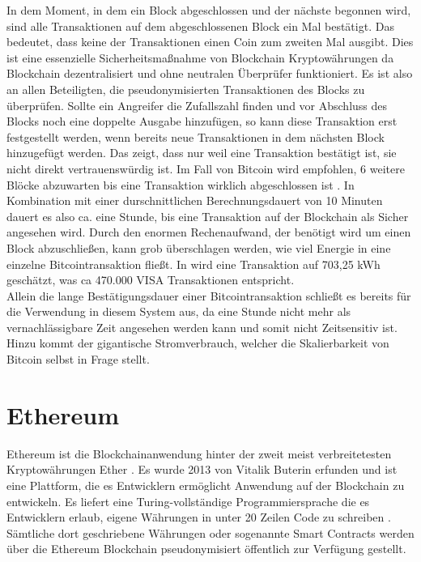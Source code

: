 \documentclass[
	fontsize=12pt,
	headings=small,
	parskip=half,           %
	bibliography=totoc,
	numbers=noenddot,       %
	open=any,               %
]{scrreprt}
\begin{document}
In dem Moment, in dem ein Block abgeschlossen und der nächste begonnen wird, sind alle Transaktionen auf dem abgeschlossenen Block ein Mal bestätigt. Das bedeutet, dass keine der Transaktionen einen Coin zum zweiten Mal ausgibt. Dies ist eine essenzielle Sicherheitsmaßnahme von Blockchain Kryptowährungen da Blockchain dezentralisiert und ohne neutralen Überprüfer funktioniert. Es ist also an allen Beteiligten, die pseudonymisierten Transaktionen des Blocks zu überprüfen. Sollte ein Angreifer die Zufallszahl finden und vor Abschluss des Blocks noch eine doppelte Ausgabe hinzufügen, so kann diese Transaktion erst festgestellt werden, wenn bereits neue Transaktionen in dem nächsten Block hinzugefügt werden. Das zeigt, dass nur weil eine Transaktion bestätigt ist, sie nicht direkt vertrauenswürdig ist. Im Fall von Bitcoin wird empfohlen, 6 weitere Blöcke abzuwarten bis eine Transaktion wirklich abgeschlossen ist \cite{btc-Zaghloul2019Bitcoin}. In Kombination mit einer durschnittlichen Berechnungsdauert von 10 Minuten dauert es also ca. eine Stunde, bis eine Transaktion auf der Blockchain als Sicher angesehen wird.
Durch den enormen Rechenaufwand, der benötigt wird um einen Block abzuschließen, kann grob überschlagen werden, wie viel Energie in eine einzelne Bitcointransaktion fließt. In \cite{btc-energyConsumption} wird eine Transaktion auf 703,25 kWh geschätzt, was ca 470.000 VISA Transaktionen entspricht.\\

Allein die lange Bestätigungsdauer einer Bitcointransaktion schließt es bereits für die Verwendung in diesem System aus, da eine Stunde nicht mehr als vernachlässigbare Zeit angesehen werden kann und somit nicht Zeitsensitiv ist. Hinzu kommt der gigantische Stromverbrauch, welcher die Skalierbarkeit von Bitcoin selbst in Frage stellt. 


\section{Ethereum}
\label{sec:ethereum}
Ethereum ist die Blockchainanwendung hinter der zweit meist verbreitetesten Kryptowährungen Ether \cite{eth-marketCapitalisation}. Es wurde 2013 von Vitalik Buterin erfunden und ist eine Plattform, die es Entwicklern ermöglicht Anwendung auf der Blockchain zu entwickeln. Es liefert eine Turing-vollständige Programmiersprache die es Entwicklern erlaub, eigene Währungen in unter 20 Zeilen Code zu schreiben \cite{eth-buterin2013ethereum}. Sämtliche dort geschriebene Währungen oder sogenannte Smart Contracts werden über die Ethereum Blockchain pseudonymisiert öffentlich zur Verfügung gestellt. 
\end{document}
